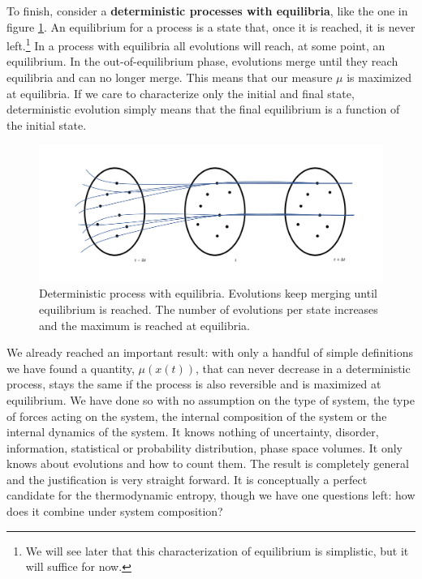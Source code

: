 \documentclass[letterpaper,twocolumn]{article}
\begin{document}
To finish, consider a \textbf{deterministic processes with equilibria}, like the one in figure \ref{fig_with_equilibria}. An equilibrium for a process is a state that, once it is reached, it is never left.\footnote{We will see later that this characterization of equilibrium is simplistic, but it will suffice for now.} In a process with equilibria all evolutions will reach, at some point, an equilibrium. In the out-of-equilibrium phase, evolutions merge until they reach equilibria and can no longer merge. This means that our measure $\mu$ is maximized at equilibria. If we care to characterize only the initial and final state, deterministic evolution simply means that the final equilibrium is a function of the initial state.

\begin{figure}[h]
	\includegraphics[width=\columnwidth]{images/Slide6.png}
	\caption{Deterministic process with equilibria. Evolutions keep merging until equilibrium is reached. The number of evolutions per state increases and the maximum is reached at equilibria.}\label{fig_with_equilibria}
\end{figure}

We already reached an important result: with only a handful of simple definitions we have found a quantity, $\mu(x(t))$, that can never decrease in a deterministic process, stays the same if the process is also reversible and is maximized at equilibrium. We have done so with no assumption on the type of system, the type of forces acting on the system, the internal composition of the system or the internal dynamics of the system. It knows nothing of uncertainty, disorder, information, statistical or probability distribution, phase space volumes. It only knows about evolutions and how to count them. The result is completely general and the justification is very straight forward. It is conceptually a perfect candidate for the thermodynamic entropy, though we have one questions left: how does it combine under system composition?
\end{document}
